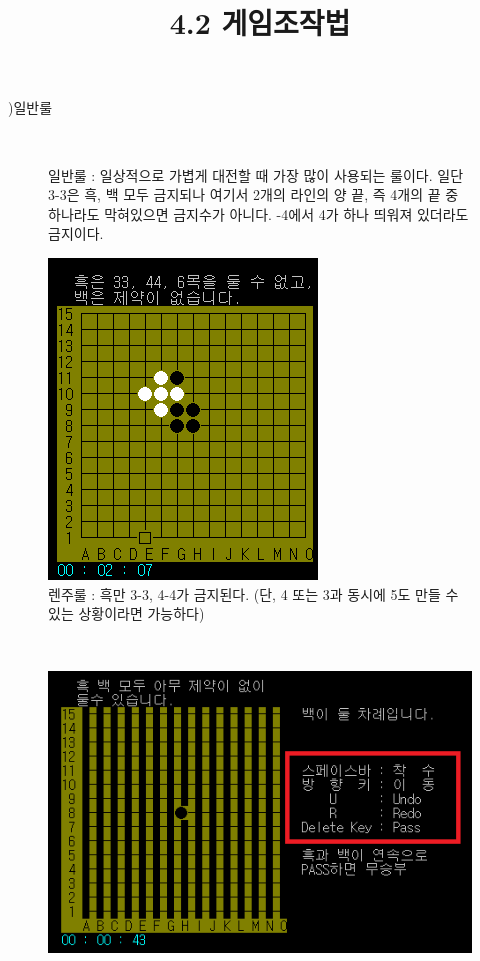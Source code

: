 \documentclass[a4paper, 11pt]{article}
\begin{document}
{{ 	
 	
 	
 	\newpage
	)일반룰
        \begin{figure}[h]
    	\begin{center}
    			
    		\ \begin{flushleft}
    			일반룰 : 일상적으로 가볍게 대전할 때 가장 많이 사용되는 룰이다. 일단 3-3은 흑, 백 모두 금지되나 여기서 2개의 라인의 양 끝, 즉 4개의 끝 중 하나라도 막혀있으면 금지수가 아니다. -4에서 4가 하나 띄워져 있더라도 금지이다.
    		\end{flushleft}
    		
    		\vspace{2cm} 	
    			
    		\includegraphics[width=0.35\linewidth]{renju.png}
    		\\ 렌주룰 : 흑만 3-3, 4-4가 금지된다. (단, 4 또는 3과 동시에 5도 만들 수 있는 상황이라면 가능하다)
    	\end{center}
    \end{figure}


  
  
  \newpage
  \title{4.2 게임조작법} \\
  
  
  \begin{figure}[h] %
  	\begin{center}
  		\includegraphics[width=0.7\linewidth]{OM_5.png}
  	\end{center}
  	\vspace{0.5cm}
  

\end{figure}}}
\end{document}
